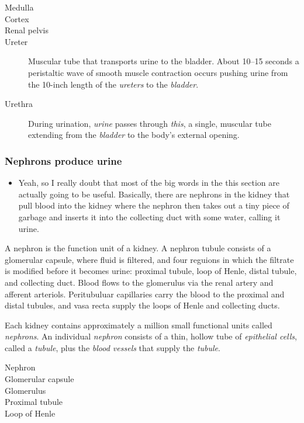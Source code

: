 \documentclass[11pt]{article}
\begin{document}
\begin{description}
\item[{Medulla}] 

\item[{Cortex}] 

\item[{Renal pelvis}] 

\item[{Ureter}] Muscular tube that transports urine to the bladder. About 10--15
seconds a peristaltic wave of smooth muscle contraction occurs pushing
urine from the 10-inch length of the \emph{ureters} to the \emph{bladder}.
\item[{Urethra}] During urination, \emph{urine} passes through \emph{this}, a single, muscular
tube extending from the \emph{bladder} to the body's external opening.
\end{description}

\subsubsection{Nephrons produce urine}
\label{sec:org7d30e64}
\begin{itemize}
\item Yeah, so I really doubt that most of the big words in the this section are
actually going to be useful. Basically, there are nephrons in the kidney that
pull blood into the kidney where the nephron then takes out a tiny piece of
garbage and inserts it into the collecting duct with some water, calling it
urine.
\end{itemize}

A nephron is the function unit of a kidney. A nephron tubule consists of a
glomerular capsule, where fluid is filtered, and four reguions in which the
filtrate is modified before it becomes urine: proximal tubule, loop of Henle,
distal tubule, and collecting duct. Blood flows to the glomerulus via the renal
artery and afferent arteriols. Peritubuluar capillaries carry the blood to the
proximal and distal tubules, and vasa recta supply the loops of Henle and
collecting ducts.

Each kidney contains approximately a million small functional units called
\emph{nephrons}. An individual \emph{nephron} consists of a thin, hollow tube of \emph{epithelial
cells}, called a \emph{tubule}, plus the \emph{blood vessels} that supply the \emph{tubule}.

\begin{description}
\item[{Nephron}] 

\item[{Glomerular capsule}] 

\item[{Glomerulus}] 

\item[{Proximal tubule}] 

\item[{Loop of Henle}] 
\end{description}
\end{document}
